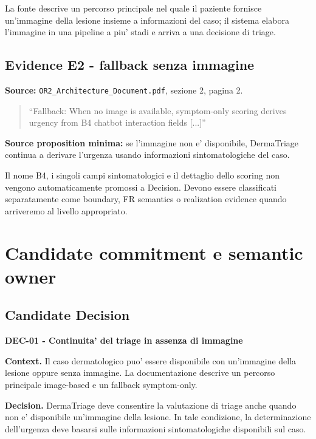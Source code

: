 \documentclass[11pt,a4paper]{article}
\begin{document}
La fonte descrive un percorso principale nel quale il paziente fornisce un'immagine della lesione insieme a informazioni del caso; il sistema elabora l'immagine in una pipeline a piu' stadi e arriva a una decisione di triage.

\subsection{Evidence E2 - fallback senza immagine}
\textbf{Source:} \texttt{OR2\_Architecture\_Document.pdf}, sezione 2, pagina 2.

\begin{quote}
\small ``Fallback: When no image is available, symptom-only scoring derives urgency from B4 chatbot interaction fields [...]''
\end{quote}

\textbf{Source proposition minima:} se l'immagine non e' disponibile, DermaTriage continua a derivare l'urgenza usando informazioni sintomatologiche del caso.

\begin{ddtaworking}[title={Cosa NON viene promosso da questa evidence}]
Il nome B4, i singoli campi sintomatologici e il dettaglio dello scoring non vengono automaticamente promossi a Decision. Devono essere classificati separatamente come boundary, FR semantics o realization evidence quando arriveremo al livello appropriato.
\end{ddtaworking}

\section{Candidate commitment e semantic owner}

\subsection{Candidate Decision}
\textbf{DEC-01 - Continuita' del triage in assenza di immagine}

\textbf{Context.} Il caso dermatologico puo' essere disponibile con un'immagine della lesione oppure senza immagine. La documentazione descrive un percorso principale image-based e un fallback symptom-only.

\textbf{Decision.} DermaTriage deve consentire la valutazione di triage anche quando non e' disponibile un'immagine della lesione. In tale condizione, la determinazione dell'urgenza deve basarsi sulle informazioni sintomatologiche disponibili sul caso.
\end{document}
